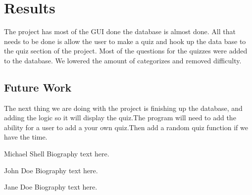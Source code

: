 \documentclass[10pt,conference,onecolumn,compsoc]{IEEEtran}
\begin{document}
\section{Results}
The project has most of the GUI done the database is almost done. All that needs to be done is allow the user to make a quiz and hook up the data base to the quiz section of the project. Most of the questions for the quizzes were added to the database. We lowered the amount of categorizes and removed difficulty. 

\subsection{Future Work}
The next thing we are doing with the project is finishing up the database, and adding the logic so it will display the quiz.The program will need to add the ability for a user to add a your own quiz.Then add a random quiz function if we have the time.







\begin{IEEEbiography}{Michael Shell}
Biography text here.
\end{IEEEbiography}

\begin{IEEEbiographynophoto}{John Doe}
Biography text here.
\end{IEEEbiographynophoto}


\begin{IEEEbiographynophoto}{Jane Doe}
Biography text here.
\end{IEEEbiographynophoto}





\end{document}
